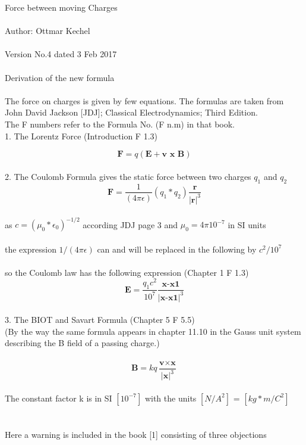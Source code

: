 \documentclass[10pt,titlepage]{article}
\begin{document}
\author{Ottmar K. Kechel}
\date{Datum}


{\large Force between moving Charges}\\\\
Author: Ottmar Kechel        
\\
\\
Version No.4 dated 3 Feb 2017\\\\
Derivation of the new formula 
\\\\
The force on charges is given by few equations.
The formulas are taken from 
\\John David Jackson [JDJ]; Classical Electrodynamics; Third Edition.
\\The F numbers refer to the Formula No. (F n.m) in that book.
\\

1. The Lorentz Force (Introduction F 1.3)


\begin{equation}
\textbf{F} = q(\textbf{E}+\textbf{v }\textbf{x}\textbf{ B})
\end{equation}\\

2. The Coulomb Formula gives the static force between two charges $q_1$ and $q_2$ 
\\

\begin{equation}
\textbf{F} = \frac{1}{(4\pi \epsilon)} (q_1*q_2)\frac{\textbf{r}}{\vert\textbf{r}\vert^3}
\end{equation}\\

as  $c = ( \mu_0 * \epsilon_0)^{-1/2}$        according JDJ page 3 and $\mu_0=4\pi10^{-7}$ in SI units
\\
\\
the expression $1/(4\pi\epsilon)$ can and will be replaced in the following by $c^2/10^7$\\
\\
so the Coulomb law has the following expression (Chapter 1  F 1.3)
\begin{equation}
\textbf{E} = \frac{ q_1c^2}{10^7}\frac{\textbf{x-x1}}{\vert\textbf{x-x1}\vert^3}
\end{equation}\\

3. The BIOT and Savart Formula (Chapter 5  F 5.5)
\\(By the way the same formula appears in chapter 11.10 in the Gauss unit system describing the B field of a passing charge.)\\
\\
\begin{equation}
\textbf{B} = kq \frac{\textbf{v} \times \textbf{x}}{\vert\textbf{x}\vert^3}
\end{equation}
\\
The constant factor k is in SI  $[10^{-7}]$ with the units $[N/A^2]$ =  $[kg*m/C^2]$
\\
\\
\\
Here a warning is included in the book [1] consisting of three objections
\end{document}
